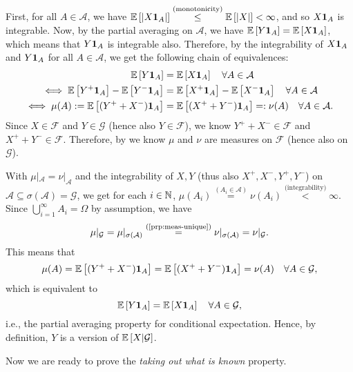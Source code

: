 \begin{enumerate}
\begin{lemma}
\begin{enumerate}[label={(\arabic*)}]
\end{enumerate}
\end{lemma}
\begin{pf}
First, for all \(A\in\mathcal{A}\), we have
\(\mathbb{E}\left[|X\mathbf{1}_{A}|\right]\overset{\text{(monotonicity)}}{\le} \mathbb{E}\left[|X|\right]<\infty\),
and so \(X\mathbf{1}_{A}\) is integrable. Now, by the partial averaging on
\(\mathcal{A}\), we have \(\mathbb{E}\left[Y\mathbf{1}_{A}\right]=\mathbb{E}\left[X\mathbf{1}_{A}\right]\),
which means that \(Y\mathbf{1}_{A}\) is integrable also. Therefore, by the
integrability of \(X\mathbf{1}_{A}\) and \(Y\mathbf{1}_{A}\) for all \(A\in\mathcal{A}\),
we get the following chain of equivalences:
\begin{align*}
\quad\mathbb{E}\left[Y\mathbf{1}_{A}\right]&=\mathbb{E}\left[X\mathbf{1}_{A}\right]\quad\forall A\in\mathcal{A} \\
\iff \mathbb{E}\left[Y^{+}\mathbf{1}_{A}\right]-\mathbb{E}\left[Y^{-}\mathbf{1}_{A}\right]
&=\mathbb{E}\left[X^{+}\mathbf{1}_{A}\right]-\mathbb{E}\left[X^{-}\mathbf{1}_{A}\right]\quad \forall A\in\mathcal{A} \\
\iff \mu(A):=\mathbb{E}\left[(Y^{+}+X^{-})\mathbf{1}_{A}\right]
&=\mathbb{E}\left[(X^{+}+Y^{-})\mathbf{1}_{A}\right]=:\nu(A)\quad \forall A\in\mathcal{A}.
\end{align*}
Since \(X\in\mathcal{F}\) and \(Y\in\mathcal{G}\) (hence also
\(Y\in\mathcal{F}\)), we know \(Y^{+}+X^{-}\in\mathcal{F}\) and
\(X^{+}+Y^{-}\in\mathcal{F}\). Therefore, by 
we know \(\mu\) and \(\nu\) are measures on \(\mathcal{F}\) (hence also on
\(\mathcal{G}\)).

With \(\mu|_{\mathcal{A}}=\nu|_{\mathcal{A}}\) and the integrability of \(X,Y\)
(thus also \(X^{+},X^{-},Y^{+},Y^{-}\)) on \(\mathcal{A}\subseteq
\sigma(\mathcal{A})=\mathcal{G}\), we get for each \(i\in\mathbb{N}\),
\(\mu(A_i)\overset{(A_i\in\mathcal{A})}{=}\nu(A_i)
\overset{\text{(integrability)}}{<}\infty\). Since
\(\bigcup_{i=1}^{\infty}A_i=\Omega\) by assumption, we have
\[
\mu|_{\mathcal{G}}=\mu|_{\sigma(\mathcal{A})}
\overset{\text{(\Cref{prp:meas-unique})}}{=}
\nu|_{\sigma(\mathcal{A})}=\nu|_{\mathcal{G}}.
\]
This means that
\[
\mu(A)=\mathbb{E}\left[(Y^{+}+X^{-})\mathbf{1}_{A}\right]
=\mathbb{E}\left[(X^{+}+Y^{-})\mathbf{1}_{A}\right]=\nu(A)\quad \forall A\in\mathcal{G},
\]
which is equivalent to
\[
\mathbb{E}\left[Y\mathbf{1}_{A}\right]=\mathbb{E}\left[X\mathbf{1}_{A}\right]\quad\forall A\in\mathcal{G},
\]
i.e., the partial averaging property for conditional expectation. Hence, by
definition, \(Y\) is a version of \(\mathbb{E}\left[X|\mathcal{G}\right]\).
\end{pf}

Now we are ready to prove the \emph{taking out what is known} property.


\end{enumerate}
